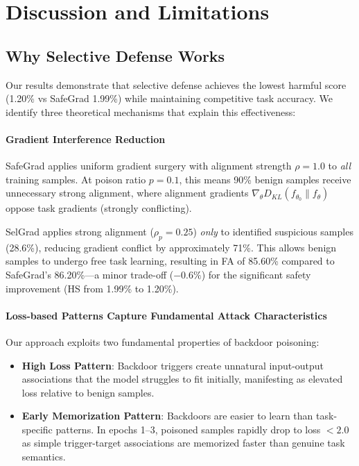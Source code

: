 \section{Discussion and Limitations}
\label{sec:limitations}

\subsection{Why Selective Defense Works}

Our results demonstrate that selective defense achieves the lowest harmful score (1.20\% vs SafeGrad 1.99\%) while maintaining competitive task accuracy. We identify three theoretical mechanisms that explain this effectiveness:

\paragraph{Gradient Interference Reduction}
SafeGrad applies uniform gradient surgery with alignment strength $\rho=1.0$ to \textit{all} training samples. At poison ratio $p=0.1$, this means 90\% benign samples receive unnecessary strong alignment, where alignment gradients $\nabla_\theta D_{KL}(f_{\theta_0} \| f_\theta)$ oppose task gradients (strongly conflicting).

SelGrad applies strong alignment ($\rho_p=0.25$) \textit{only} to identified suspicious samples (28.6\%), reducing gradient conflict by approximately 71\%. This allows benign samples to undergo free task learning, resulting in FA of 85.60\% compared to SafeGrad's 86.20\%---a minor trade-off ($-0.6\%$) for the significant safety improvement (HS from 1.99\% to 1.20\%).

\paragraph{Loss-based Patterns Capture Fundamental Attack Characteristics}
Our approach exploits two fundamental properties of backdoor poisoning:
\begin{itemize}
    \item \textbf{High Loss Pattern}: Backdoor triggers create unnatural input-output associations that the model struggles to fit initially, manifesting as elevated loss relative to benign samples.
    \item \textbf{Early Memorization Pattern}: Backdoors are easier to learn than task-specific patterns. In epochs 1--3, poisoned samples rapidly drop to loss $<2.0$ as simple trigger-target associations are memorized faster than genuine task semantics.
\end{itemize}

